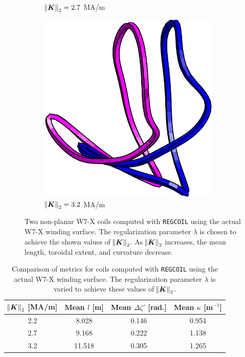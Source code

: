 \documentclass[aps,unsortedaddress]{revtex4-1}
\begin{document}
\begin{figure}
\begin{subfigure}[b]{0.3\textwidth}
\caption{$\norm{\bm{K}}_2 = 2.7$ MA/m}
\end{subfigure}
\begin{subfigure}[b]{0.3\textwidth}
\includegraphics[width=0.95\textwidth]{target_3_2e6.pdf}
\caption{$\norm{\bm{K}}_2 = 3.2$ MA/m}
\end{subfigure}
\caption{Two non-planar W7-X coils computed with \texttt{REGCOIL} using the actual W7-X winding surface. The regularization parameter $\lambda$ is chosen to achieve the shown values of $\norm{\bm{K}}_2$. As $\norm{\bm{K}}_2$ increases, the mean length, toroidal extent, and curvature decrease.}
\label{rmsKcoilcompare}
\end{figure}

\begin{table}
\renewcommand{\arraystretch}{1.4}
\begin{tabular} { | c | c | c | c | }
\hline
$\norm{\bm{K}}_2$ [MA/m] & Mean $l$ [m] & Mean $\Delta \zeta'$ [rad.] & Mean $\kappa$ [m$^{-1}$] \\ \hline 
2.2 & 8.028 & 0.146 & 0.954 \\ \hline
2.7 & 9.168 & 0.222 & 1.138 \\ \hline
3.2 & 11.518 & 0.305 & 1.265 \\ \hline
\end{tabular}
\caption{Comparison of metrics for coils computed with \texttt{REGCOIL} using the actual W7-X winding surface. The regularization parameter $\lambda$ is varied to achieve these values of $\norm{\bm{K}}_2$.}
\label{rmsKcoilmetrics}
\end{table}
\FloatBarrier
\end{document}
